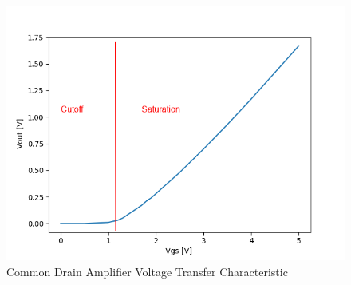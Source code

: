 \FloatBarrier

\begin{figure}[h!]
	\centering
	\includegraphics[scale=0.50]{../data/common_drain.png}
	\caption{Common Drain Amplifier Voltage Transfer Characteristic}
	\label{fig:common_drain}
\end{figure}

\FloatBarrier

